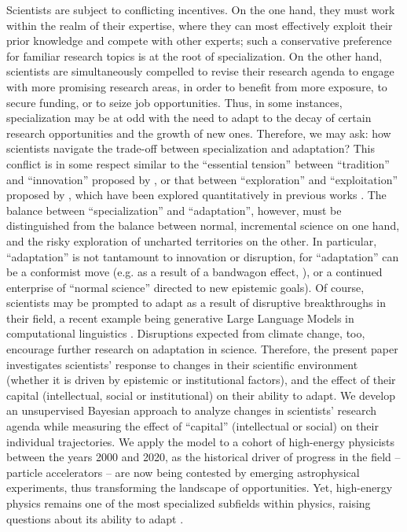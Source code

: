 \documentclass{article}
\begin{document}
Scientists are subject to conflicting incentives. On the one hand, they must work within the realm of their expertise, where they can most effectively exploit their prior knowledge and compete with other experts; such a conservative preference for familiar research topics is at the root of specialization. On the other hand, scientists are simultaneously compelled to revise their research agenda to engage with more promising research areas, in order to benefit from more exposure, to secure funding, or to seize job opportunities. Thus, in some instances, specialization may be at odd with the need to adapt to the decay of certain research opportunities and the growth of new ones. Therefore, we may ask: how scientists navigate the trade-off between specialization and adaptation? This conflict is in some respect similar to the ``essential tension'' between ``tradition'' and ``innovation'' proposed by \citet{Kuhn1997}, or that between ``exploration'' and ``exploitation'' proposed by \citet{March1991}, which have been explored quantitatively in previous works \citep{Foster2015,Jia2017,Aleta2019,Zeng2019,Tripodi2020,Chakresh2023,Feifan2023}%
. The balance between ``specialization'' and ``adaptation'', however, must be distinguished from the balance between normal, incremental science on one hand, and the risky exploration of uncharted territories on the other. In particular, ``adaptation'' is not tantamount to innovation or disruption, for ``adaptation'' can be a conformist move (e.g. as a result of a bandwagon effect, \citealt{Fujimura1988}), or a continued enterprise of ``normal science'' directed to new epistemic goals). Of course, scientists may be prompted to adapt as a result of disruptive breakthroughs in their field, a recent example being generative Large Language Models in computational linguistics \citep{Naomi2023}. Disruptions expected from climate change, too, encourage further research on adaptation in science. Therefore, the present paper investigates scientists' response to changes in their scientific environment (whether it is driven by epistemic or institutional factors), and the effect of their capital (intellectual, social or institutional) on their ability to adapt. We develop an unsupervised Bayesian approach to analyze changes in scientists' research agenda while measuring the effect of ``capital'' (intellectual or social) on their individual trajectories. We apply the model to a cohort of high-energy physicists between the years 2000 and 2020, as the historical driver of progress in the field -- particle accelerators -- are now being contested by emerging astrophysical experiments, thus transforming the landscape of opportunities. Yet, high-energy physics remains one of the most specialized subfields within physics, raising questions about its ability to adapt \citep{Battiston2019,Aleta2019}.
\end{document}
